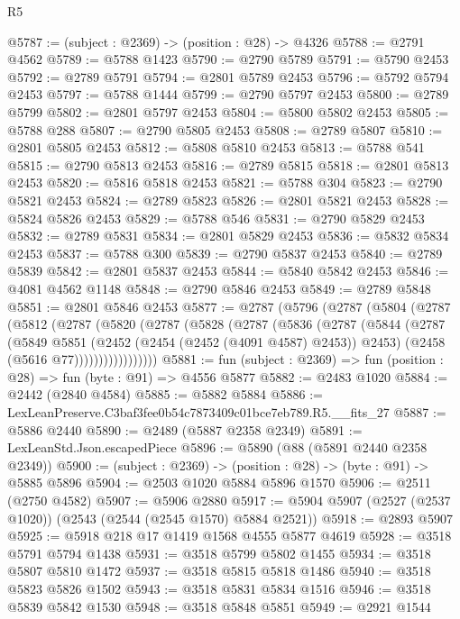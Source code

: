 \begin{lexlean}{R5}
\begin{coremodule}
@5787 := (subject : @2369) -> (position : @28) -> @4326
@5788 := @2791 @4562
@5789 := @5788 @1423
@5790 := @2790 @5789
@5791 := @5790 @2453
@5792 := @2789 @5791
@5794 := @2801 @5789 @2453
@5796 := @5792 @5794 @2453
@5797 := @5788 @1444
@5799 := @2790 @5797 @2453
@5800 := @2789 @5799
@5802 := @2801 @5797 @2453
@5804 := @5800 @5802 @2453
@5805 := @5788 @288
@5807 := @2790 @5805 @2453
@5808 := @2789 @5807
@5810 := @2801 @5805 @2453
@5812 := @5808 @5810 @2453
@5813 := @5788 @541
@5815 := @2790 @5813 @2453
@5816 := @2789 @5815
@5818 := @2801 @5813 @2453
@5820 := @5816 @5818 @2453
@5821 := @5788 @304
@5823 := @2790 @5821 @2453
@5824 := @2789 @5823
@5826 := @2801 @5821 @2453
@5828 := @5824 @5826 @2453
@5829 := @5788 @546
@5831 := @2790 @5829 @2453
@5832 := @2789 @5831
@5834 := @2801 @5829 @2453
@5836 := @5832 @5834 @2453
@5837 := @5788 @300
@5839 := @2790 @5837 @2453
@5840 := @2789 @5839
@5842 := @2801 @5837 @2453
@5844 := @5840 @5842 @2453
@5846 := @4081 @4562 @1148
@5848 := @2790 @5846 @2453
@5849 := @2789 @5848
@5851 := @2801 @5846 @2453
@5877 := @2787
    (@5796
      (@2787
        (@5804
          (@2787
            (@5812
              (@2787
                (@5820
                  (@2787
                    (@5828
                      (@2787
                        (@5836
                          (@2787
                            (@5844
                              (@2787
                                (@5849
                                  @5851
                                  (@2452 (@2454 (@2452 (@4091 @4587) @2453)) @2453)
                                  (@2458 (@5616 @77)))))))))))))))))
@5881 := fun (subject : @2369) => fun (position : @28) => fun (byte : @91) => @4556 @5877
@5882 := @2483 @1020
@5884 := @2442 (@2840 @4584)
@5885 := @5882 @5884
@5886 := LexLeanPreserve.C3baf3fee0b54c7873409c01bce7eb789.R5.__fits_27
@5887 := @5886 @2440
@5890 := @2489 (@5887 @2358 @2349)
@5891 := LexLeanStd.Json.escapedPiece
@5896 := @5890 (@88 (@5891 @2440 @2358 @2349))
@5900 := (subject : @2369) -> (position : @28) -> (byte : @91) -> @5885 @5896
@5904 := @2503 @1020 @5884 @5896 @1570
@5906 := @2511 (@2750 @4582)
@5907 := @5906 @2880
@5917 := @5904 @5907 (@2527 (@2537 @1020)) (@2543 (@2544 (@2545 @1570) @5884 @2521))
@5918 := @2893 @5907
@5925 := @5918 @218 @17 @1419 @1568 @4555 @5877 @4619
@5928 := @3518 @5791 @5794 @1438
@5931 := @3518 @5799 @5802 @1455
@5934 := @3518 @5807 @5810 @1472
@5937 := @3518 @5815 @5818 @1486
@5940 := @3518 @5823 @5826 @1502
@5943 := @3518 @5831 @5834 @1516
@5946 := @3518 @5839 @5842 @1530
@5948 := @3518 @5848 @5851
@5949 := @2921 @1544

\end{coremodule}
\end{lexlean}
